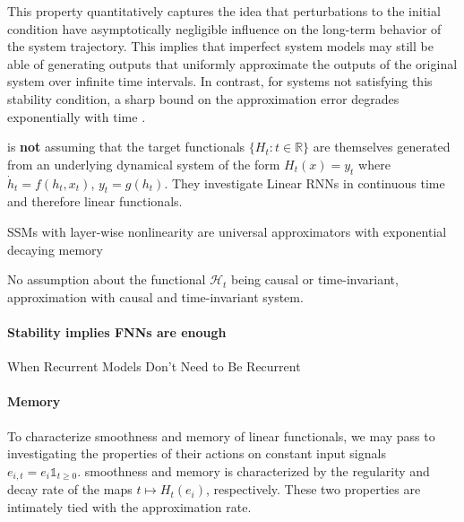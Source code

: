\documentclass{article}
\theoremstyle{definition}
\theoremstyle{remark}
\begin{document}
This property quantitatively captures the idea that perturbations to the initial condition have asymptotically negligible influence on the long-term behavior of the system trajectory.
This implies that imperfect system models may still be able of generating outputs that uniformly approximate the outputs of the original system over infinite time intervals.
In contrast, for systems not satisfying this stability condition, a sharp bound on the approximation error degrades exponentially with time \citep{hirsch1974nonautonomous, sontag2013mathematical}.

\citet{li2020curse} is \textbf{not} assuming that the target functionals \(\{H_t : t \in \mathbb{R}\}\) are themselves generated from an underlying dynamical system of the form \(H_t(x) = y_t\) where \(\dot{h}_t = f(h_t, x_t)\), \(y_t = g(h_t)\).
They investigate Linear RNNs in continuous time and therefore linear functionals.

SSMs with layer-wise nonlinearity are universal approximators with exponential decaying memory \citep{wang2024state}

No assumption about the functional $\mathcal{H}_t$ being causal or time-invariant, approximation with causal and time-invariant system\citep{hanson2021learning}. 


\paragraph{Stability implies FNNs are enough}
When Recurrent Models Don't Need to Be Recurrent \citep{miller2018stable}


\paragraph{Memory}
To characterize smoothness and memory of linear functionals, we may pass to investigating the properties of their actions on constant input signals $e_{i,t} = e_i \mathds{1}_{t\geq 0}$.
smoothness and memory is characterized by the regularity and decay rate of the maps $t\mapsto H_t(e_i)$, respectively.
These two properties are intimately tied with the approximation rate.


\end{document}
